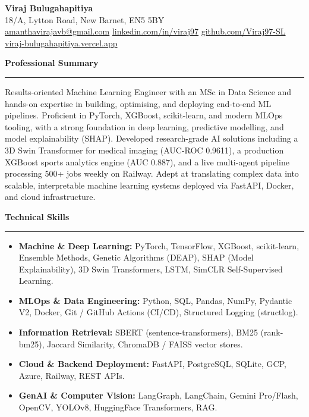 \documentclass[a4paper,10pt]{article}
\newcommand{\sect}[1]{\vspace{8pt}\noindent\textbf{\color{heading}\large #1}\vspace{3pt}\hrule\vspace{6pt}}
\begin{document}
\begin{center}
  {\LARGE \textbf{Viraj Bulugahapitiya}} \\
  18/A, Lytton Road, New Barnet, EN5 5BY \\
  \vspace{3pt}
  \href{mailto:amanthavirajavb@gmail.com}{\faEnvelope\;amanthavirajavb@gmail.com} \quad
  \href{https://linkedin.com/in/viraj97}{\faLinkedin\;linkedin.com/in/viraj97} \quad
  \href{https://github.com/Viraj97-SL}{\faGithub\;github.com/Viraj97-SL} \quad
  \href{https://viraj-bulugahapitiya.vercel.app}{\faGlobe\;viraj-bulugahapitiya.vercel.app}
\end{center}

\sect{Professional Summary}
Results-oriented Machine Learning Engineer with an MSc in Data Science and hands-on expertise in building, optimising, and deploying end-to-end ML pipelines. Proficient in PyTorch, XGBoost, scikit-learn, and modern MLOps tooling, with a strong foundation in deep learning, predictive modelling, and model explainability (SHAP). Developed research-grade AI solutions including a 3D Swin Transformer for medical imaging (AUC-ROC 0.9611), a production XGBoost sports analytics engine (AUC 0.887), and a live multi-agent pipeline processing 500+ jobs weekly on Railway. Adept at translating complex data into scalable, interpretable machine learning systems deployed via FastAPI, Docker, and cloud infrastructure.

\sect{Technical Skills}
\begin{itemize}[leftmargin=*, itemsep=2pt, topsep=2pt]
    \item \textbf{Machine \& Deep Learning:} PyTorch, TensorFlow, XGBoost, scikit-learn, Ensemble Methods, Genetic Algorithms (DEAP), SHAP (Model Explainability), 3D Swin Transformers, LSTM, SimCLR Self-Supervised Learning.
    \item \textbf{MLOps \& Data Engineering:} Python, SQL, Pandas, NumPy, Pydantic V2, Docker, Git / GitHub Actions (CI/CD), Structured Logging (structlog).
    \item \textbf{Information Retrieval:} SBERT (sentence-transformers), BM25 (rank-bm25), Jaccard Similarity, ChromaDB / FAISS vector stores.
    \item \textbf{Cloud \& Backend Deployment:} FastAPI, PostgreSQL, SQLite, GCP, Azure, Railway, REST APIs.
    \item \textbf{GenAI \& Computer Vision:} LangGraph, LangChain, Gemini Pro/Flash, OpenCV, YOLOv8, HuggingFace Transformers, RAG.
\end{itemize}
\end{document}

